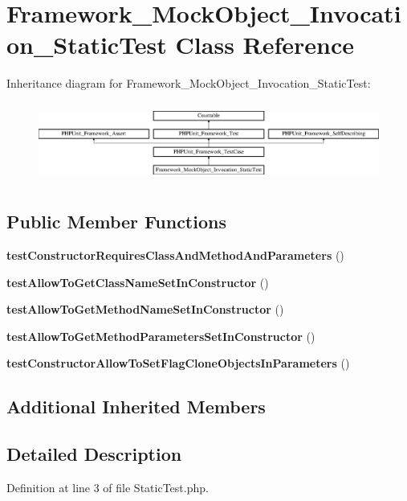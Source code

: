 \section{Framework\+\_\+\+Mock\+Object\+\_\+\+Invocation\+\_\+\+Static\+Test Class Reference}
\label{class_framework___mock_object___invocation___static_test}
Inheritance diagram for Framework\+\_\+\+Mock\+Object\+\_\+\+Invocation\+\_\+\+Static\+Test\+:\begin{figure}[H]
\begin{center}
\leavevmode
\includegraphics[height=2.629108cm]{class_framework___mock_object___invocation___static_test}
\end{center}
\end{figure}
\subsection*{Public Member Functions}
\begin{DoxyCompactItemize}
\item 
{\bf test\+Constructor\+Requires\+Class\+And\+Method\+And\+Parameters} ()
\item 
{\bf test\+Allow\+To\+Get\+Class\+Name\+Set\+In\+Constructor} ()
\item 
{\bf test\+Allow\+To\+Get\+Method\+Name\+Set\+In\+Constructor} ()
\item 
{\bf test\+Allow\+To\+Get\+Method\+Parameters\+Set\+In\+Constructor} ()
\item 
{\bf test\+Constructor\+Allow\+To\+Set\+Flag\+Clone\+Objects\+In\+Parameters} ()
\end{DoxyCompactItemize}
\subsection*{Additional Inherited Members}


\subsection{Detailed Description}


Definition at line 3 of file Static\+Test.\+php.



